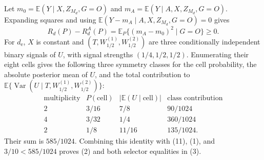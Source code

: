 Let \(m_0=\mathbb E(Y\mid X,Z_{M_d},G=O)\) and \(m_A=\mathbb E(Y\mid A,X,Z_{M_d},G=O)\).  Expanding squares and using \(\mathbb E(Y-m_A\mid A,X,Z_{M_d},G=O)=0\) gives
\[
 R_d(P)-R_d^A(P)=\mathbb E_P\{(m_A-m_0)^2\mid G=O\}\ge0.                     \tag{11}
\]
For \(d_{\mathrm e}\), \(X\) is constant and \((T,W_{1/2}^{(1)},W_{1/2}^{(2)})\) are three conditionally independent binary signals of \(U\), with signal strengths \((1/4,1/2,1/2)\).  Enumerating their eight cells gives the following three symmetry classes for the cell probability, the absolute posterior mean of \(U\), and the total contribution to \(\mathbb E\{\operatorname{Var}(U\mid T,W_{1/2}^{(1)},W_{1/2}^{(2)})\}\):
\[
\begin{array}{c|c|c|c}
\text{multiplicity}&P(\text{cell})&|\mathbb E(U\mid\text{cell})|&
\text{class contribution}\\ \hline
2&3/16&7/8&90/1024\\
4&3/32&1/4&360/1024\\
2&1/8&11/16&135/1024.
\end{array}
\]
Their sum is \(585/1024\).  Combining this identity with (11), (1), and \(3/10<585/1024\) proves (2) and both selector equalities in (3).

